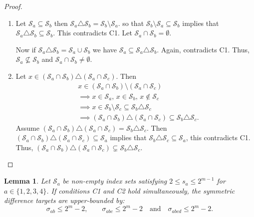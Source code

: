 \documentclass[pdflatex,sn-mathphys-num]{sn-jnl}%
\theoremstyle{thmstyleone}%
\newtheorem{lemma}{Lemma}
\theoremstyle{thmstyletwo}%
\theoremstyle{thmstylethree}%
\begin{document}
\begin{proof}
\begin{enumerate}
    \item Let $\mathcal{S}_a \subseteq \mathcal{S}_b$ then  $\mathcal{S}_a \triangle \mathcal{S}_b = \mathcal{S}_b \setminus \mathcal{S}_a$. so that 
    $\mathcal{S}_b \setminus \mathcal{S}_a \subseteq \mathcal{S}_b$ implies that $\mathcal{S}_a \triangle \mathcal{S}_b \subseteq \mathcal{S}_b$. This contradicts  C1. 
    Let $\mathcal{S}_a \cap \mathcal{S}_b = \emptyset$.
    
    Now if  $\mathcal{S}_a \triangle \mathcal{S}_b = \mathcal{S}_a \cup \mathcal{S}_b$  we have  $\mathcal{S}_a \subseteq \mathcal{S}_a \triangle \mathcal{S}_b$. Again, contradicts  C1.
    Thus, $\mathcal{S}_a \not\subseteq \mathcal{S}_b$ and $\mathcal{S}_a \cap \mathcal{S}_b \neq \emptyset$.

    \item Let $x \in (\mathcal{S}_a \cap \mathcal{S}_b) \triangle (\mathcal{S}_a \cap \mathcal{S}_c)$. Then 
    \begin{align*}
    &x \in (\mathcal{S}_a \cap \mathcal{S}_b) \setminus (\mathcal{S}_a \cap \mathcal{S}_c)\\ 
    &\implies x \in \mathcal{S}_a, \, x \in \mathcal{S}_b, \, x \notin \mathcal{S}_c\\
    & \implies x \in \mathcal{S}_b \setminus \mathcal{S}_c \subseteq \mathcal{S}_b \triangle \mathcal{S}_c\\
    & \implies (\mathcal{S}_a \cap \mathcal{S}_b) \triangle (\mathcal{S}_a \cap \mathcal{S}_c) \subseteq \mathcal{S}_b \triangle \mathcal{S}_c.
    \end{align*}
    Assume $(\mathcal{S}_a \cap \mathcal{S}_b) \triangle (\mathcal{S}_a \cap \mathcal{S}_c) = \mathcal{S}_b \triangle \mathcal{S}_c$.
    Then $(\mathcal{S}_a \cap \mathcal{S}_b) \triangle (\mathcal{S}_a \cap \mathcal{S}_c) \subseteq \mathcal{S}_a$ implies that  $\mathcal{S}_b \triangle \mathcal{S}_c \subseteq \mathcal{S}_a$,  this contradicts  C1. Thus, $(\mathcal{S}_a \cap \mathcal{S}_b) \triangle (\mathcal{S}_a \cap \mathcal{S}_c) \subsetneq \mathcal{S}_b \triangle \mathcal{S}_c$.
\end{enumerate}
\end{proof}

\begin{lemma}\label{lem:bound_theory}
Let $\mathcal{S}_a$ be non-empty index sets satisfying $2 \leq s_a \leq 2^{m-1}$ for $a \in \{1,2,3,4\}$. If conditions C1 and C2 hold simultaneously, the symmetric difference targets are upper-bounded by:
\[
\sigma_{ab} \leq 2^m - 2, \quad \quad \sigma_{abc} \leq 2^m - 2 \quad \text{and} \quad \sigma_{abcd} \leq 2^m - 2.
\]
\end{lemma}
\end{document}
